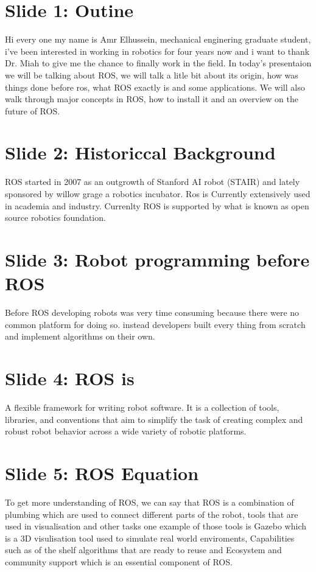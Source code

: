 \documentclass[
12pt,draftcls,onecolumn%
]{IEEEtran}
\begin{document}


\section{Slide 1: Outine}
Hi every one my name is Amr Elhussein, mechanical enginering graduate student, i've been interested in working in robotics for four years now and i want to thank Dr. Miah to give me the chance to finally work in the field. 
In today's presentaion we will be talking about ROS, we will talk a litle bit about its origin, how was things done before ros, what ROS exactly is and some applications. 
We will also walk through major concepts in ROS, how to install it and an overview on the future of ROS.
\section{Slide 2: Historiccal Background}
ROS started in 2007 as an outgrowth of Stanford AI robot (STAIR) and lately sponsored by willow grage a robotics incubator. 
Ros is Currently extensively used in academia and industry. Currenlty ROS is supported by what is known as open source robotics foundation. 
\section{Slide 3: Robot programming before ROS}
Before ROS developing robots was very time consuming because there were no common platform for doing so. instead developers built every thing from scratch and implement algorithms on their own. 
\section{Slide 4: ROS is } 
A flexible framework for writing robot software. It is a collection of tools,
libraries, and conventions that aim to simplify the task of creating complex
and robust robot behavior across a wide variety of robotic platforms.
\section{Slide 5: ROS Equation}
To get more understanding of ROS, we can say that ROS is a combination of plumbing which are used to connect different parts of the robot, tools that are used in visualisation and other tasks one example of those tools is Gazebo which is a 3D visulisation tool used to simulate real world enviroments, Capabilities such as of the shelf algorithms that are ready to reuse and Ecosystem and community support which is an essential component of ROS.
\end{document}
